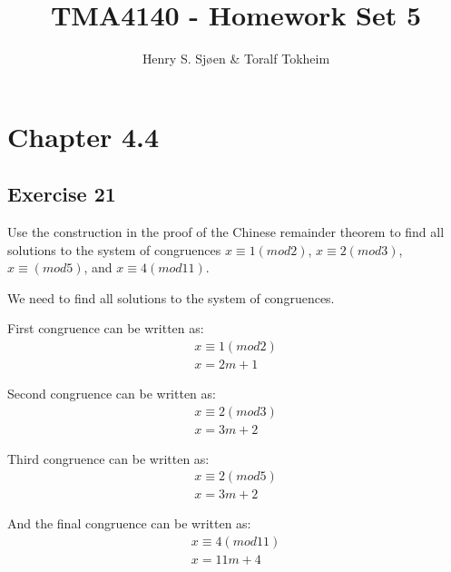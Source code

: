 \documentclass[12pt]{article}
\author{Henry S. Sjøen \& Toralf Tokheim}
\title{
  \textbf{TMA4140 - Homework Set 5}\\
    \color{darkred}{\textbf{RETTES}}
  }
\begin{document}
    \maketitle
    \thispagestyle{empty}
    \pagebreak
    \tableofcontents
    \pagebreak
    
    \section{Chapter 4.4}
    \subsection{Exercise 21}
    Use the construction in the proof of the Chinese remainder theorem to find all solutions to the system of congruences $x \equiv 1(mod 2)$, $x \equiv 2 (mod 3)$, $x \equiv (mod 5)$, and $x \equiv 4 (mod 11)$.
  
    We need to find all solutions to the system of congruences.

    First congruence can be written as:
    \begin{equation}
      \begin{split}
        x \equiv  1(mod2)\\
        x = 2m + 1
      \end{split}
    \end{equation}
    
    Second congruence can be written as:
    \begin{equation}
      \begin{split}
        x \equiv  2(mod3)\\
        x = 3m + 2
      \end{split}
    \end{equation}
    
    Third congruence can be written as:
    \begin{equation}
      \begin{split}
      x \equiv  2(mod5)\\
      x = 3m + 2
      \end{split}
    \end{equation}

    And the final congruence can be written as:
    \begin{equation}
      \begin{split}
        x \equiv 4(mod11)\\
        x = 11m+4
      \end{split}
    \end{equation}
\end{document}
